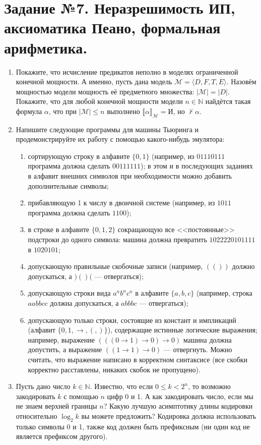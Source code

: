 \documentclass[10pt,a4paper,oneside]{article}
\begin{document}
\section*{Задание №7. Неразрешимость ИП, аксиоматика Пеано, формальная арифметика.}
\begin{enumerate}
\item Покажите, что исчисление предикатов неполно в моделях ограниченной конечной мощности. 
А именно, пусть дана модель $\mathcal{M} = \langle D, F, T, E \rangle$. 
Назовём мощностью модели мощность её предметного множества: $|\mathcal{M}| = |D|$.
Покажите, что для любой конечной мощности модели $n\in\mathbb{N}$ найдётся такая формула $\alpha$, что 
при $|\mathcal{M}|\le n$ выполнено $\llbracket\alpha\rrbracket_\mathcal{M} = \text{И}$, но $\not\vdash\alpha$.

\item Напишите следующие программы для машины Тьюринга и продемонстрируйте их работу с помощью какого-нибудь эмулятора:
\begin{enumerate}
\item сортирующую строку в алфавите $\{0,1\}$ (например, из $01110111$ программа должна сделать $00111111$);
в этом и в последующих заданиях в алфавит внешних символов при необходимости можно добавить дополнительные символы;
\item прибавляющую 1 к числу в двоичной системе (например, из $1011$ программа должна сделать $1100$);
\item в строке в алфавите $\{0,1,2\}$ сокращающую все <<постоянные>> подстроки до одного символа:
машина должна превратить $1022220101111$ в $1020101$;
\item допускающую правильные скобочные записи (например, $(())$ должно допускаться, а $)()($ --- отвергаться);
\item допускающую строки вида $a^nb^nc^n$ в алфавите $\{a,b,c\}$ (например, строка $aabbcc$ должна допускаться, а $abbbc$ --- отвергаться);
\item допускающую только строки, состоящие из констант и импликаций (алфавит $\{ 0, 1, \rightarrow, (, ) \}$), 
содержащие истинные логические выражения;
например, выражение $(((0 \rightarrow 1) \rightarrow 0) \rightarrow 0)$ машина должна допустить, а
выражение $((1 \rightarrow 1) \rightarrow 0)$ --- отвергнуть. Можно считать, что выражение написано в корректном синтаксисе (все скобки корректно
расставлены, никаких скобок не пропущено).
\end{enumerate}

\item Пусть дано число $k \in \mathbb{N}$. Известно, что если $0 \le k < 2^n$, то возможно закодировать $k$ с помощью $n$ цифр 0 и 1.
А как закодировать число, если мы не знаем верхней границы $n$? Какую лучшую асимптотику длины кодировки относительно $\log_2 k$ вы можете
предложить? Кодировка должна использовать только символы 0 и 1, также код должен быть префиксным (ни один код не является префиксом другого).


\end{enumerate}
\end{document}
